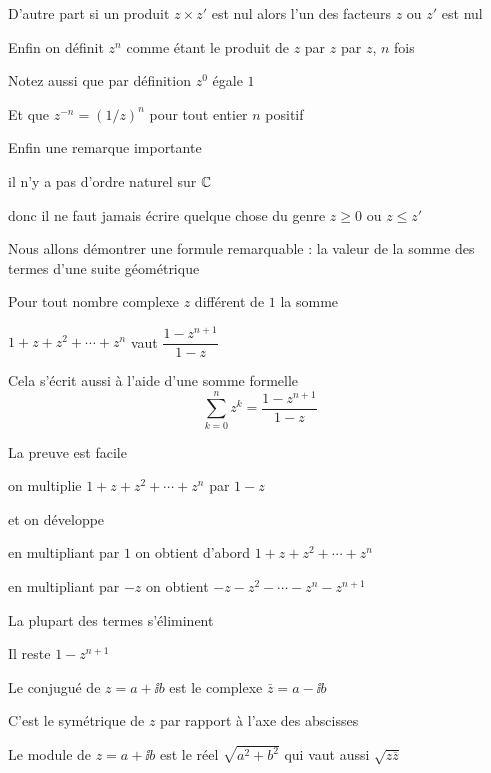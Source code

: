 D'autre part si un produit $z \times z'$ est nul alors l'un des facteurs $z$ ou $z'$
est nul

\change

Enfin on définit $z^n$ comme étant le produit de $z$ par $z$ par $z$, $n$ fois

Notez aussi que par définition $z^0$ égale $1$

Et que $z^{-n} = (1/z)^n$ pour tout entier $n$ positif

\change

Enfin une remarque importante

il n'y a pas d'ordre naturel sur $\mathbb{C}$

donc il ne faut jamais écrire quelque chose du genre
$z\ge 0$ ou $z \le z'$


\diapo

Nous allons démontrer une formule remarquable : la valeur de la somme 
des termes d'une suite géométrique

Pour tout nombre complexe $z$ différent de $1$
la somme 

$1 + z + z^2 + \cdots + z^n$ vaut $\dfrac{1 - z^{n + 1}}{1 - z}$

\change

Cela s'écrit aussi à l'aide d'une somme formelle
$$\sum_{k=0}^n z^k = \dfrac{1 - z^{n + 1}}{1 - z}$$

\change

La preuve est facile

on multiplie $1 + z + z^2 + \cdots + z^n$ par $1-z$

\change 

et on développe

en multipliant par $1$
on obtient d'abord 
$1 + z + z^2 + \cdots + z^n$


en multipliant par $-z$ on obtient
$-z -z^2 - \cdots - z^n - z^{n+1} $

\change

La plupart des termes s'éliminent 

Il reste $1-z^{n+1}$


\diapo

Le conjugué de $z=a+\ii b$ est le complexe 
$\bar z = a - \ii b$

C'est le symétrique de $z$ par rapport à l'axe des abscisses

\change

Le module de $z = a+\ii b$ est le réel $\sqrt{a^2 + b^2}$
qui vaut aussi $\sqrt{z\overline z}$

